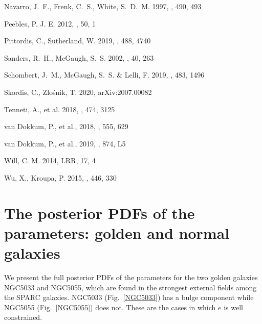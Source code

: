 \documentclass[twocolumn,tighten]{aastex63}
\begin{document}
\begin{thebibliography}{}
 {{Navarro}, J.~F.}, {{Frenk}, C.~S.}, {{White}, S.~D.~M.} 1997, \apj, {490}, {493}

 {{Peebles}, P. J. E.} 2012, {\araa}, {50}, {1}

 {{Pittordis}, C.}, {{Sutherland}, W.} 2019, \mnras, 488, 4740

 {{Sanders}, R.~H.}, {{McGaugh}, S.~S.} 2002, {\araa}, {40}, {263}

 {{Schombert}, J.~M.}, {{McGaugh}, S.~S.} \& {{Lelli}, F.} 2019, {\mnras}, {483}, {1496}

 {{Skordis}, C.}, {{Zlo\'{s}nik}, T.} 2020, arXiv:2007.00082

 {{Tenneti}, A.}, {et al.} 2018, {\mnras}, {474}, {3125}

 {{van Dokkum}, P.}, {et al.}, 2018, \nat, 555, 629

 {{van Dokkum}, P.}, {et al.}, 2019, \apj, 874, L5
  
 {{Will}, C. M.} 2014, {LRR}, {{17}}, {4}

 {{Wu}, X.}, {{Kroupa}, P.} 2015, {\mnras}, {446}, {330}

\end{thebibliography}


\newpage
  

\appendix


\section{The posterior PDFs of the parameters: golden and normal galaxies} 

We present the full posterior PDFs of the parameters for the two golden galaxies NGC5033 and NGC5055, which are found in the strongest external fields among the SPARC galaxies. NGC5033 (Fig.~\ref{NGC5033}) has a bulge component while NGC5055 (Fig.~\ref{NGC5055}) does not. These are the cases in which $e$ is well constrained.
\end{document}
